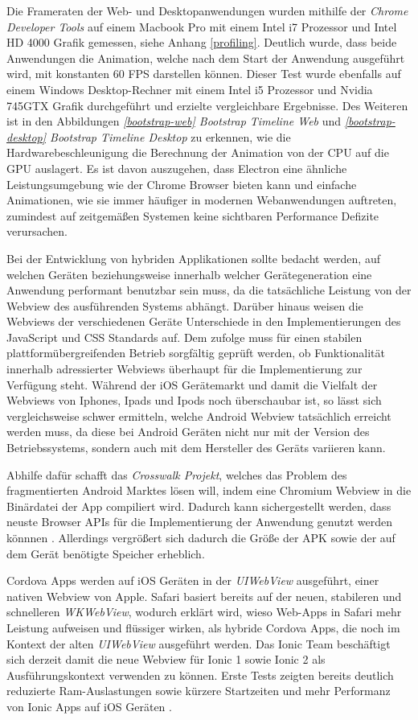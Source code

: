 Die Frameraten der Web- und Desktopanwendungen wurden mithilfe der
\emph{Chrome Developer Tools} auf einem Macbook Pro mit einem Intel i7 Prozessor und Intel HD 4000 Grafik gemessen,
siehe Anhang \ref{profiling}.
Deutlich wurde, dass beide Anwendungen die Animation, welche nach dem Start der Anwendung ausgeführt wird,
mit konstanten 60 FPS darstellen können. Dieser Test wurde ebenfalls auf einem Windows Desktop-Rechner mit einem Intel i5 Prozessor und Nvidia 745GTX Grafik durchgeführt und
erzielte vergleichbare Ergebnisse. Des Weiteren ist in den Abbildungen \emph{\ref{bootstrap-web} Bootstrap Timeline Web} und \emph{\ref{bootstrap-desktop} Bootstrap Timeline Desktop} zu erkennen,
wie die Hardwarebeschleunigung die Berechnung der Animation von der CPU auf die GPU auslagert.
Es ist davon auszugehen, dass Electron eine ähnliche Leistungsumgebung wie der Chrome Browser bieten kann und
einfache Animationen, wie sie immer häufiger in modernen Webanwendungen auftreten, zumindest auf zeitgemäßen Systemen keine
sichtbaren Performance Defizite verursachen.

Bei der Entwicklung von hybriden Applikationen sollte bedacht werden,
auf welchen Geräten beziehungsweise innerhalb welcher Gerätegeneration eine Anwendung performant benutzbar sein muss,
da die tatsächliche Leistung von der Webview des ausführenden Systems abhängt.
Darüber hinaus weisen die Webviews der verschiedenen Geräte Unterschiede in den Implementierungen
des JavaScript und \ac{CSS} Standards auf. Dem zufolge muss für einen stabilen plattformübergreifenden Betrieb sorgfältig geprüft werden,
ob Funktionalität innerhalb adressierter Webviews überhaupt für die Implementierung zur Verfügung steht.
Während der iOS Gerätemarkt und damit die Vielfalt der Webviews von Iphones, Ipads und Ipods noch überschaubar ist,
so lässt sich vergleichsweise schwer ermitteln, welche Android Webview tatsächlich erreicht werden muss,
da diese bei Android Geräten nicht nur mit der Version des Betriebssystems, sondern auch mit dem Hersteller des Geräts variieren kann.

Abhilfe dafür schafft das \emph{Crosswalk Projekt}, welches das Problem des fragmentierten Android Marktes lösen will,
indem eine Chromium Webview in die Binärdatei der App compiliert wird. Dadurch kann sichergestellt werden,
dass neuste Browser APIs für die Implementierung der Anwendung genutzt werden könnnen \cite{Cross69:online}.
Allerdings vergrößert sich dadurch die Größe der \ac{APK} sowie der auf dem Gerät benötigte Speicher erheblich.

Cordova Apps werden auf iOS Geräten in der \emph{UIWebView} ausgeführt, einer nativen Webview von Apple. Safari basiert bereits
auf der neuen, stabileren und schnelleren \emph{WKWebView}, wodurch erklärt wird, wieso Web-Apps in Safari
mehr Leistung aufweisen und flüssiger wirken, als hybride Cordova Apps, die noch im Kontext der alten \emph{UIWebView} ausgeführt werden.
Das Ionic Team beschäftigt sich derzeit damit die neue Webview für Ionic 1 sowie Ionic 2 als Ausführungskontext verwenden zu können.
Erste Tests zeigten bereits deutlich reduzierte Ram-Auslastungen sowie kürzere Startzeiten und mehr Performanz von Ionic Apps auf iOS Geräten \cite{Cordo84:online}.


